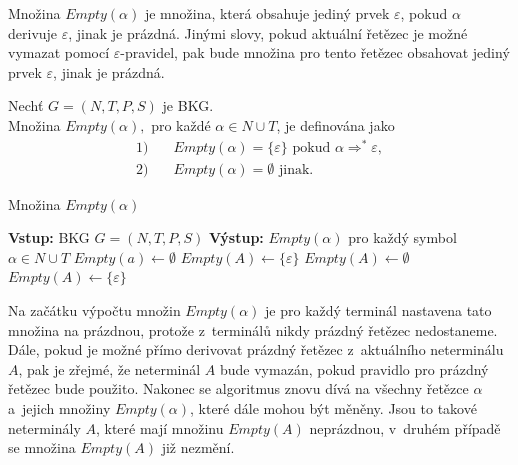 Množina $Empty(\alpha)$ je množina, která obsahuje jediný prvek $\varepsilon$, pokud $\alpha$ derivuje $\varepsilon$, jinak je prázdná.
Jinými slovy, pokud aktuální řetězec je možné vymazat pomocí $\varepsilon$-pravidel, pak bude množina pro tento řetězec obsahovat jediný prvek $\varepsilon$, jinak je prázdná.
\begin{definition}\label{def_mnozina_empty}
    Nechť $G = (N, T, P, S)$ je BKG. \\
    Množina $Empty(\alpha),$ pro každé $\alpha \in N \cup T$, je definována jako
    \begin{align*}
        1) & \quad Empty(\alpha) = \{\varepsilon\} \text{ pokud } \alpha \Rightarrow^* \varepsilon, \\
        2) & \quad Empty(\alpha) = \emptyset \text{ jinak}.
    \end{align*}
\end{definition}
\begin{algorithm}
    \caption{Množina $Empty(\alpha)$}
    \label{alg_mnozina_empty}
    \begin{algorithmic}[1]
        \State \textbf{Vstup:} BKG $G = (N, T, P, S)$
        \State \textbf{Výstup:} $Empty(\alpha)$ pro každý symbol $\alpha \in N \cup T$
        \State
            \State $Empty(a) \gets \emptyset$
        \EndFor
                \State $Empty(A) \gets \{\varepsilon\}$
            \Else
                \State $Empty(A) \gets \emptyset$
            \EndIf
        \EndFor
                \State $Empty(A) \gets \{\varepsilon\}$
            \EndIf
        \EndWhile
    \end{algorithmic}
\end{algorithm}
Na začátku výpočtu množin $Empty(\alpha)$ je pro každý terminál nastavena tato množina na prázdnou, protože z~terminálů nikdy prázdný řetězec nedostaneme.
Dále, pokud je možné přímo derivovat prázdný řetězec z~aktuálního neterminálu $A$, pak je zřejmé, že neterminál $A$ bude vymazán, pokud pravidlo pro prázdný řetězec bude použito.
Nakonec se algoritmus znovu dívá na všechny řetězce $\alpha$ a~jejich množiny $Empty(\alpha)$, které dále mohou být měněny.
Jsou to takové neterminály $A$, které mají množinu $Empty(A)$ neprázdnou, v~druhém případě se množina $Empty(A)$ již nezmění.

